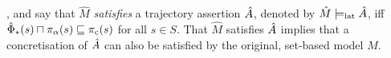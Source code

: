 \noindent {}, and say that $\hat M$ \textit{satisfies} a trajectory assertion $\hat {A}$, denoted by $\hat M \models_{\textrm{lat}} \hat {A}$, iff $\hat \Phi_{*}(s) \sqcap \pi_{\alpha}(s) \sqsubseteq \operatorname{\pi_{\textrm{c}}}(s)$ for all $s \in S$. That $\hat M$ satisfies $\hat {A}$ implies that a concretisation of $\hat {A}$ can also be satisfied by the original, set-based model $M$.

